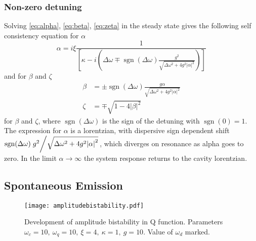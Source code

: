 \subsubsection{Non-zero detuning}
Solving \cref{eq:alpha}, \cref{eq:beta}, \cref{eq:zeta} in the steady state gives the following self consistency equation for $\alpha$
\begin{equation}
  \alpha = i \xi\frac{1}{\left[\kappa-i\left(\Delta \omega \mp \operatorname{sgn}(\Delta \omega) \frac{g^2}{\sqrt{\Delta \omega^2 +4g^2 |\alpha|^2}}\right)\right]}
\end{equation}
and for $\beta$ and $\zeta$
\begin{align}
  \beta& = \pm \operatorname{sgn}(\Delta \omega) \frac{g \alpha}{\sqrt{\Delta \omega^2 + 4 g^2 |\alpha|^2}}\\
  \zeta& = \mp \sqrt{1-4|\beta|^2}
\end{align}
for $\beta$ and $\zeta$, where $\operatorname{sgn}(\Delta \omega)$ is the sign of the detuning with $\operatorname{sgn}(0) = 1$.
The expression for $\alpha$ is a lorentzian, with dispersive sign dependent shift $ \operatorname{sgn}(\Delta\omega)\flatfrac{g^2}{\sqrt{\Delta\omega^2+4g^2\abs{\alpha}^2}}$, which diverges on resonance as alpha goes to zero. 
In the limit $\alpha \rightarrow \infty$ the system response returns to the cavity lorentzian.

\subsection{Spontaneous Emission}
\begin{figure*}[bht]
  \texttt{[image: amplitudebistability.pdf]}
  \caption{Development of amplitude bistability in Q function. Parameters $\omega_c=10,\ \omega_q=10,\ \xi=4,\ \kappa=1,\ g=10$. Value of $\omega_d$ marked.}
  \label{amplitudebistability}
\end{figure*}

